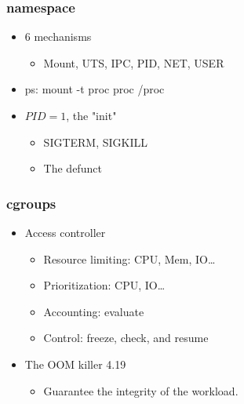 \documentclass{beamer}
\begin{document}
\begin{frame}
    \frametitle{namespace}
    \begin{itemize}
        \item 6 mechanisms
              \begin{itemize}
                  \item Mount, UTS, IPC, PID, NET, USER
              \end{itemize}
        \item ps: mount -t proc proc /proc
        \item $PID = 1$, the "init"\cite{docker_pid1}
              \begin{itemize}
                  \item SIGTERM, SIGKILL
                  \item The defunct
              \end{itemize}
    \end{itemize}
\end{frame}

\begin{frame}
    \frametitle{cgroups}
    \begin{itemize}
        \item Access controller
              \begin{itemize}
                  \item Resource limiting: CPU, Mem, IO\dots
                  \item Prioritization: CPU, IO\dots
                  \item Accounting: evaluate
                  \item Control: freeze, check, and resume
              \end{itemize}
        \item The OOM killer 4.19
              \begin{itemize}
                  \item Guarantee the integrity of the workload.
              \end{itemize}
    \end{itemize}
\end{frame}
\end{document}
